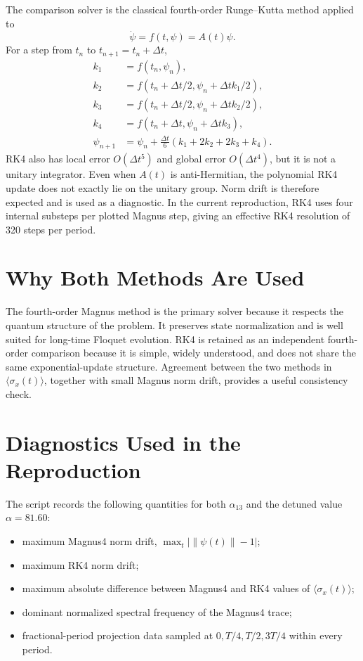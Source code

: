\documentclass[11pt,a4paper]{article}
\begin{document}
The comparison solver is the classical fourth-order Runge--Kutta method applied to
\begin{equation}
\dot{\psi}=f(t,\psi)=A(t)\psi.
\end{equation}
For a step from \(t_n\) to \(t_{n+1}=t_n+\Delta t\),
\begin{align}
k_1 &= f(t_n,\psi_n),\\
k_2 &= f(t_n+\Delta t/2,\psi_n+\Delta t k_1/2),\\
k_3 &= f(t_n+\Delta t/2,\psi_n+\Delta t k_2/2),\\
k_4 &= f(t_n+\Delta t,\psi_n+\Delta t k_3),\\
\psi_{n+1} &= \psi_n+\frac{\Delta t}{6}(k_1+2k_2+2k_3+k_4).
\end{align}
RK4 also has local error \(O(\Delta t^5)\) and global error \(O(\Delta t^4)\), but it is not a unitary integrator. Even when \(A(t)\) is anti-Hermitian, the polynomial RK4 update does not exactly lie on the unitary group. Norm drift is therefore expected and is used as a diagnostic. In the current reproduction, RK4 uses four internal substeps per plotted Magnus step, giving an effective RK4 resolution of 320 steps per period.

\section{Why Both Methods Are Used}

The fourth-order Magnus method is the primary solver because it respects the quantum structure of the problem. It preserves state normalization and is well suited for long-time Floquet evolution. RK4 is retained as an independent fourth-order comparison because it is simple, widely understood, and does not share the same exponential-update structure. Agreement between the two methods in \(\langle\sigma_x(t)\rangle\), together with small Magnus norm drift, provides a useful consistency check.

\section{Diagnostics Used in the Reproduction}

The script records the following quantities for both \(\alpha_{13}\) and the detuned value \(\alpha=81.60\):
\begin{itemize}
  \item maximum Magnus4 norm drift, \(\max_t |\|\psi(t)\|-1|\);
  \item maximum RK4 norm drift;
  \item maximum absolute difference between Magnus4 and RK4 values of \(\langle\sigma_x(t)\rangle\);
  \item dominant normalized spectral frequency of the Magnus4 trace;
  \item fractional-period projection data sampled at \(0,T/4,T/2,3T/4\) within every period.
\end{itemize}
\end{document}
